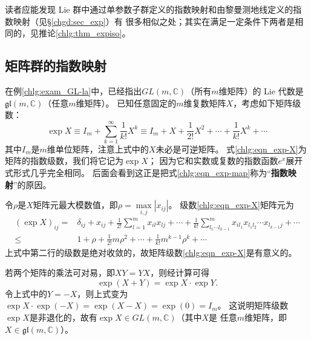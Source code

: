 读者应能发现 Lie 群中通过单参数子群定义的指数映射和由黎曼测地线定义的指数映射（见\S\ref{chgd:sec_exp}）有
很多相似之处；其实在满足一定条件下两者是相同的，见推论\ref{chlg:thm_expiso}。



\subsection{矩阵群的指数映射}\label{chlg:sec_GL-exp}

在例\ref{chlg:exam_GL-la}中，已经指出$GL(m,\mathbb{C})$（所有$m$维矩阵）的
 Lie 代数是$\mathfrak{gl}(m,\mathbb{C})$（任意$m$维矩阵）。
已知任意固定的$m$维复数矩阵$X$，考虑如下矩阵级数：
\begin{equation}\label{chlg:eqn_exp-X}
    \exp X \equiv I_m+\sum_{k=1}^{\infty} \frac{1}{k!}X^k \equiv 
    I_m + X + \frac{1}{2!} X^2 + \cdots +\frac{1}{k!} X^k + \cdots 
\end{equation}
其中$I_m$是$m$维单位矩阵，注意上式中的$X$未必是可逆矩阵。
式\eqref{chlg:eqn_exp-X}为矩阵的指数级数，我们将它记为$\exp X$；
因为它和实数或复数的指数函数$e^x$展开式形式几乎完全相同。
后面会看到这正是把式\eqref{chlg:eqn_exp-map}称为“\textbf{指数映射}”的原因。


令$\rho$是$X$矩阵元最大模数值，即$\rho= \max\limits_{i,j} |x_{ij}|$。
级数\eqref{chlg:eqn_exp-X}矩阵元为
\begin{align*}
    (\exp X )_{ij} =& \delta_{ij} + x_{ij} + \frac{1}{2!} \sum_{l=1}^{m} x_{il} x_{lj}
     + \cdots + \frac{1}{k!} \sum_{l_1\cdots l_{k-1}}^{m} x_{il_1} x_{l_1 l_2} \cdots x_{l_{k-1} j}
     + \cdots \\
    \leqslant & 1 +\rho +  \frac{1}{2!} m \rho ^2+\cdots + \frac{1}{k!} m^{k-1} \rho^k + \cdots
\end{align*}
上式中第二行的级数是绝对收敛的，故矩阵级数\eqref{chlg:eqn_exp-X}是有意义的。


若两个矩阵的乘法可对易，即$XY=YX$，则经计算可得 %
\begin{equation}\label{chlg:eqn_tmp34}
    \exp(X+Y) = \exp X \cdot \exp Y . 
\end{equation}
令上式中的$Y=-X$，则上式变为$\exp X \cdot \exp (-X) = \exp(X-X) = \exp (0) = I_m$。
这说明矩阵级数$\exp X$是非退化的，故有$\exp X \in GL(m,\mathbb{C})$（其中$X$是
任意$m$维矩阵，即$X \in \mathfrak{gl}(m,\mathbb{C})$）。

